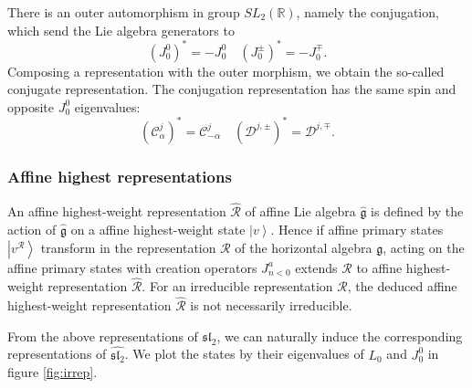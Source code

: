 \documentclass[10pt,a4paper]{article}
\numberwithin{equation}{section}
\newcommand{\ket}[1]{\left| #1 \right\rangle}
\begin{document}
There is an outer automorphism in group $SL_{2}(\mathbb{R})$, namely the conjugation, which send the Lie algebra generators to 
\begin{equation}
    \left(J^{0}_{0}\right)^{*} = - J^{0}_{0} \quad \left(J^{\pm}_{0}\right)^{*} = - J^{\mp}_{0}.
\end{equation}
Composing a representation with the outer morphism, we obtain the so-called conjugate representation. The conjugation representation 
has the same spin and opposite $J^{0}_{0}$ eigenvalues:
\begin{equation}
    \left(\mathcal{C}^{j}_{\alpha}\right)^{*} = \mathcal{C}^{j}_{-\alpha} \quad \left(\mathcal{D}^{j,\pm}\right)^{*} = \mathcal{D}^{j,\mp}.
\end{equation}

\subsubsection*{Affine highest representations}
An affine highest-weight representation $\widehat{\mathcal{R}}$ of affine Lie algebra $\widehat{\mathfrak{g}}$ is defined by the action 
of $\widehat{\mathfrak{g}}$ on a affine highest-weight state $\ket{v}$. Hence if 
affine primary states $\ket{v^{\mathcal{R}}}$ transform in the representation $\mathcal{R}$ of the horizontal algebra $\mathfrak{g}$,
acting on the affine primary states with creation operators $J^{a}_{n<0}$ extends $\mathcal{R}$ to affine highest-weight representation 
$\widehat{\mathcal{R}}$. For an irreducible representation $\mathcal{R}$, the deduced affine 
highest-weight representation $\widehat{\mathcal{R}}$ is not necessarily irreducible.

From the above representations of $\mathfrak{sl}_{2}$, we can naturally induce the corresponding representations of $\widehat{\mathfrak{sl}_{2}}$. 
We plot the states by their eigenvalues of $L_{0}$ and $J^{0}_{0}$ in figure \ref{fig:irrep}.

\newpage
\end{document}
